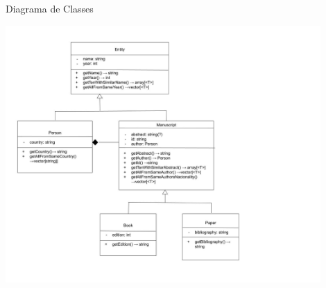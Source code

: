\documentclass{beamer}
\begin{document}
\begin{frame}{Diagrama de Classes}
\begin{center}
\includegraphics[width=0.9\textwidth]{../UML.jpg}
\end{center}
\end{frame}
\end{document}
